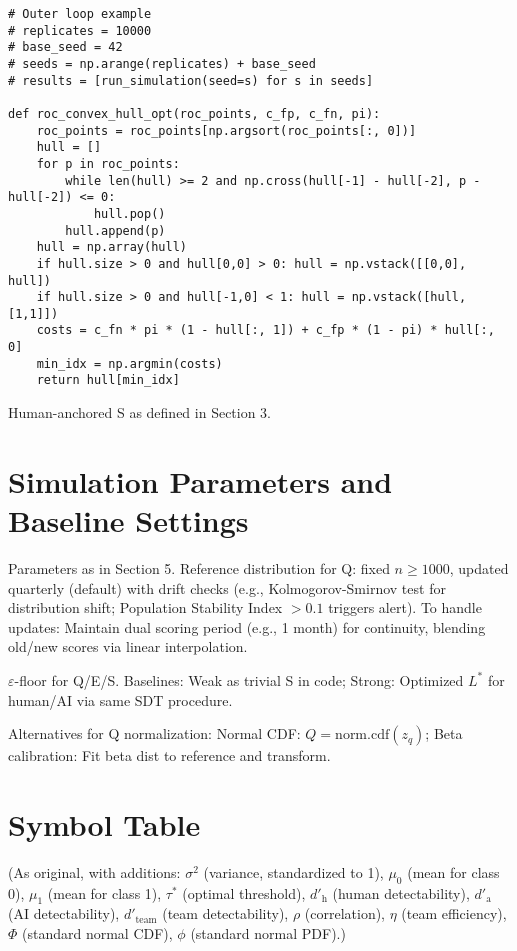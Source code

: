 \documentclass[a4paper]{article}
\begin{document}
\begin{verbatim}
# Outer loop example
# replicates = 10000
# base_seed = 42
# seeds = np.arange(replicates) + base_seed
# results = [run_simulation(seed=s) for s in seeds]

def roc_convex_hull_opt(roc_points, c_fp, c_fn, pi):
    roc_points = roc_points[np.argsort(roc_points[:, 0])]
    hull = []
    for p in roc_points:
        while len(hull) >= 2 and np.cross(hull[-1] - hull[-2], p - hull[-2]) <= 0:
            hull.pop()
        hull.append(p)
    hull = np.array(hull)
    if hull.size > 0 and hull[0,0] > 0: hull = np.vstack([[0,0], hull])
    if hull.size > 0 and hull[-1,0] < 1: hull = np.vstack([hull, [1,1]])
    costs = c_fn * pi * (1 - hull[:, 1]) + c_fp * (1 - pi) * hull[:, 0]
    min_idx = np.argmin(costs)
    return hull[min_idx]
\end{verbatim}
Human-anchored S as defined in Section 3.

\section{Simulation Parameters and Baseline Settings}

Parameters as in Section 5. Reference distribution for Q: fixed $n \ge 1000$, updated quarterly (default) with drift checks (e.g., Kolmogorov-Smirnov test for distribution shift; Population Stability Index $>0.1$ triggers alert). To handle updates: Maintain dual scoring period (e.g., 1 month) for continuity, blending old/new scores via linear interpolation.

$\varepsilon$-floor for Q/E/S. Baselines: Weak as trivial S in code; Strong: Optimized $L^*$ for human/AI via same SDT procedure.

Alternatives for Q normalization: Normal CDF: $Q = \text{norm.cdf}(z_q)$; Beta calibration: Fit beta dist to reference and transform.

\section{Symbol Table}

(As original, with additions: $\sigma^2$ (variance, standardized to 1), $\mu_0$ (mean for class 0), $\mu_1$ (mean for class 1), $\tau^*$ (optimal threshold), $d'_{\text{h}}$ (human detectability), $d'_{\text{a}}$ (AI detectability), $d'_{\text{team}}$ (team detectability), $\rho$ (correlation), $\eta$ (team efficiency), $\Phi$ (standard normal CDF), $\phi$ (standard normal PDF).)
\end{document}
